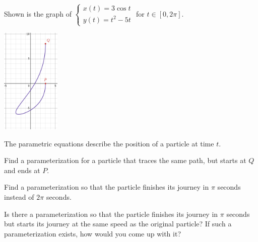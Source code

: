 \documentclass{workbook}
\begin{document}
\begin{slide}
	\question

		Shown is the graph of $\displaystyle
		\begin{cases}
			x(t)=3\cos t \\
			y(t)=t^2-5t
		\end{cases}
		$
		for $t\in[0,2\pi]$.
		\begin{center}
	\includegraphics[height=2in]{images/parametric1.png}
		\end{center}

	
	The parametric equations describe the position of a particle at time $t$.

	\begin{parts}
		\item Find a parameterization for a particle that traces the same path,
		but starts at $Q$ and ends at $P$.

		\item Find a parameterization so that the particle finishes its journey in $\pi$ seconds instead of $2\pi$ seconds.

		\item Is there a parameterization so that the particle
		finishes its journey in $\pi$ seconds but starts its journey at
		the same speed as the original particle? If such a parameterization exists, how would you come up with it?
		
	\end{parts}
\end{slide}
\end{document}
